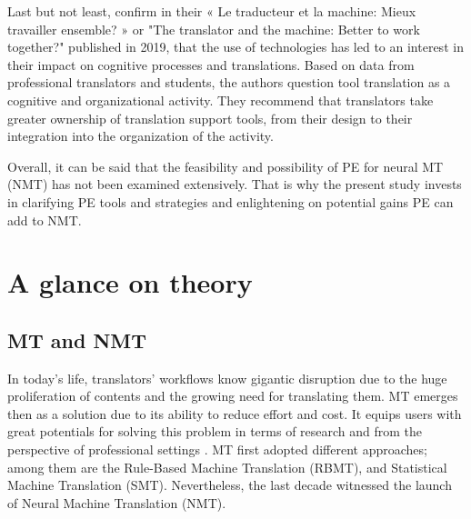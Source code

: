 \documentclass[english]{textolivre}
\begin{document}
Last but not least, \textcite{ehrensberger-dow_traducteur_2019} confirm in their « Le traducteur et la machine: Mieux travailler ensemble? » or "The translator and the machine: Better to work together?" published in 2019, that the use of technologies has led to an interest in their impact on cognitive processes and translations. Based on data from professional translators and students, the authors question tool translation as a cognitive and organizational activity. They recommend that translators take greater ownership of translation support tools, from their design to their integration into the organization of the activity.

Overall, it can be said that the feasibility and possibility of PE for neural MT (NMT) has not been examined extensively. That is why the present study invests in clarifying PE tools and strategies and enlightening on potential gains PE can add to NMT.

\section{A glance on theory}

\subsection{MT and NMT}

In today’s life, translators’ workflows know gigantic disruption due to the huge proliferation of contents and the growing need for translating them. MT emerges then as a solution due to its ability to reduce effort and cost. It equips users with great potentials for solving this problem in terms of research and from the perspective of professional settings \cite[p. 594]{rivera-trigueros_machine_2022}. MT first adopted different approaches; among them are the Rule-Based Machine Translation (RBMT), and Statistical Machine Translation (SMT). Nevertheless, the last decade witnessed the launch of Neural Machine Translation (NMT).
\end{document}

